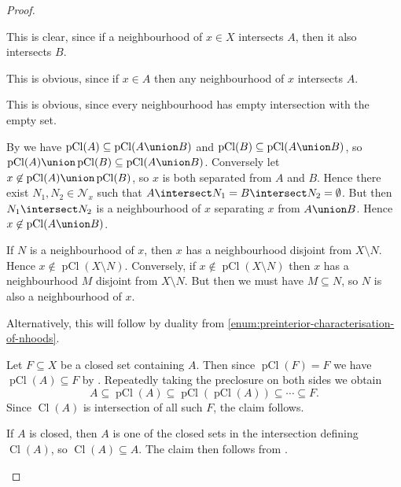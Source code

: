 \documentclass[article, a4paper, 11pt, oneside]{memoir}
\numberwithin{equation}{chapter}
\newcommand{\calN}{\mathcal{N}}
\newcommand{\nhoods}[1]{\calN_{#1}}
\newcommand{\pCl}[1]{\operatorname{pCl}(#1)}
\renewcommand{\closure}[1]{\operatorname{Cl}(#1)}
\begin{document}
\begin{proof}
    \begin{proofsec}
        \item[Proof of \subcref{enum:preclosure-increasing}]
        This is clear, since if a neighbourhood of $x \in X$ intersects $A$, then it also intersects $B$.
        
        \item[Proof of \subcref{enum:preclosure-extensive}]
        This is obvious, since if $x \in A$ then any neighbourhood of $x$ intersects $A$.
    
        \item[Proof of \subcref{enum:preclosure-nullary-unions}]
        This is obvious, since every neighbourhood has empty intersection with the empty set.
    
        \item[Proof of \subcref{enum:preclosure-binary-unions}]
        By  we have $\pCl{A} \subseteq \pCl{A \union B}$ and $\pCl{B} \subseteq \pCl{A \union B}$, so $\pCl{A} \union \pCl{B} \subseteq \pCl{A \union B}$. Conversely let $x \not\in \pCl{A} \union \pCl{B}$, so $x$ is both separated from $A$ and $B$. Hence there exist $N_1,N_2 \in \nhoods{x}$ such that $A \intersect N_1 = B \intersect N_2 = \emptyset$. But then $N_1 \intersect N_2$ is a neighbourhood of $x$ separating $x$ from $A \union B$. Hence $x \not\in \pCl{A \union B}$.
        
        \item[Proof of \subcref{enum:preclosure-characterisation-of-nhoods}]
        If $N$ is a neighbourhood of $x$, then $x$ has a neighbourhood disjoint from $X \setminus N$. Hence $x \not\in \pCl{X \setminus N}$. Conversely, if $x \not\in \pCl{X \setminus N}$ then $x$ has a neighbourhood $M$ disjoint from $X \setminus N$. But then we must have $M \subseteq N$, so $N$ is also a neighbourhood of $x$.

        Alternatively, this will follow by duality from \cref{enum:preinterior-characterisation-of-nhoods}.

        \item[Proof of \subcref{enum:preclosure-inclusion-series}]
        Let $F \subseteq X$ be a closed set containing $A$. Then since $\pCl{F} = F$ we have $\pCl{A} \subseteq F$ by . Repeatedly taking the preclosure on both sides we obtain
        \begin{equation*}
            A
                \subseteq \pCl{A}
                \subseteq \pCl{\pCl{A}}
                \subseteq \cdots
                \subseteq F.
        \end{equation*}
        Since $\closure{A}$ is intersection of all such $F$, the claim follows.

        \item[Proof of \subcref{enum:preclosure-equals-closure}]
        If $A$ is closed, then $A$ is one of the closed sets in the intersection defining $\closure{A}$, so $\closure{A} \subseteq A$. The claim then follows from .
    \end{proofsec}
\end{proof}
\end{document}

